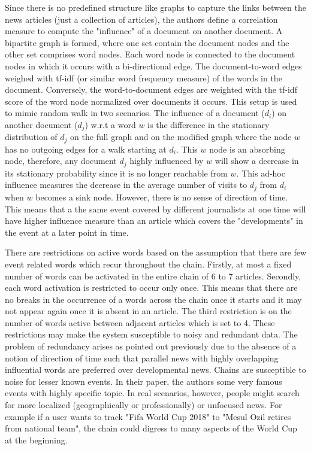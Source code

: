 \documentclass[10pt]{article}
\begin{document}
\par Since there is no predefined structure like graphs to capture the links between the news articles (just a collection of articles), the authors define a correlation measure to compute the "influence" of a document on another document. A bipartite graph is formed, where one set contain the document nodes and the other set comprises word nodes. Each word node is connected to the document nodes in which it occurs with a bi-directional edge. The document-to-word edges weighed with tf-idf (or similar word frequency measure) of the words in the document. Conversely, the word-to-document edges are weighted with the tf-idf score of the word node normalized over documents it occurs. This setup is used to mimic random walk in two scenarios. The influence of a document ($d_i$) on another document ($d_j$) w.r.t a word $w$ is the difference in the stationary distribution of $d_j$ on the full graph and on the modified graph where the node $w$ has no outgoing edges for a walk starting at $d_i$. This $w$ node is an absorbing node, therefore, any document $d_j$ highly influenced by $w$ will show a decrease in its stationary probability since it is no longer reachable from $w$. This ad-hoc influence measures the decrease in the average number of visits to $d_j$ from $d_i$ when $w$ becomes a sink node. However, there is no sense of direction of time. This means that a the same event covered by different journalists at one time will have higher influence measure than an article which covers the "developments" in the event at a later point in time.  

\par There are restrictions on active words based on the assumption that there are few event related words which recur throughout the chain. Firstly, at most a fixed number of words can be activated in the entire chain of 6 to 7 articles. Secondly, each word activation is restricted to occur only once. This means that there are no breaks in the occurrence of a words across the chain once it starts and it may not appear again once it is absent in an article. The third restriction is on the number of words active between adjacent articles which is set to 4. These restrictions may make the system susceptible to noisy and redundant data. The problem of redundancy arises as pointed out previously due to the absence of a notion of direction of time such that parallel news with highly overlapping influential words are preferred over developmental news. Chains are susceptible to noise for lesser known events. In their paper, the authors some very famous events with highly specific topic. In real scenarios, however, people might search for more localized (geographically or professionally) or unfocused news. For example if a user wants to track "Fifa World Cup 2018" to "Mesul Ozil retires from national team", the chain could digress to many aspects of the World Cup at the beginning. 
\end{document}
